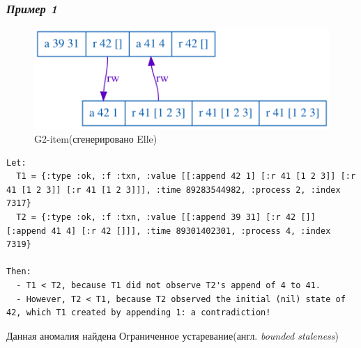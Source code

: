 \documentclass[12pt,  openany]{book}
\begin{document}
\subsubsection{\textit{Пример 1}}
\begin{figure}[H]
  \includegraphics[width=\textwidth]{staleness/32.png}
  \caption{G2-item(сгенерировано Elle)}
\end{figure}
\par

\begin{lstlisting}[caption={Пояснение к G2-item аномалии (сгенерировано Elle)}]
Let:
  T1 = {:type :ok, :f :txn, :value [[:append 42 1] [:r 41 [1 2 3]] [:r 41 [1 2 3]] [:r 41 [1 2 3]]], :time 89283544982, :process 2, :index 7317}
  T2 = {:type :ok, :f :txn, :value [[:append 39 31] [:r 42 []] [:append 41 4] [:r 42 []]], :time 89301402301, :process 4, :index 7319}

Then:
  - T1 < T2, because T1 did not observe T2's append of 4 to 41.
  - However, T2 < T1, because T2 observed the initial (nil) state of 42, which T1 created by appending 1: a contradiction!
\end{lstlisting}
Данная аномалия найдена Ограниченное устаревание(англ.  \textit{bounded staleness})
\end{document}

